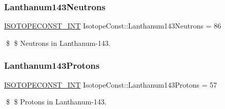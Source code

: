 \subsubsection{\texorpdfstring{Lanthanum143\+Neutrons}{Lanthanum143Neutrons}}
{\footnotesize\ttfamily \mbox{\hyperlink{group___isotope_const-_macros_ga5f18360b3e99483a35c32d789e62621c}{I\+S\+O\+T\+O\+P\+E\+C\+O\+N\+S\+T\+\_\+\+I\+NT}} Isotope\+Const\+::\+Lanthanum143\+Neutrons = 86}

\$ \$ Neutrons in Lanthanum-\/143. \mbox{\label{group___isotope_const-_lanthanum-_la143_ga9ef3306a039b4b6a98c0d0f2dcf8eef3}} 
\subsubsection{\texorpdfstring{Lanthanum143\+Protons}{Lanthanum143Protons}}
{\footnotesize\ttfamily \mbox{\hyperlink{group___isotope_const-_macros_ga5f18360b3e99483a35c32d789e62621c}{I\+S\+O\+T\+O\+P\+E\+C\+O\+N\+S\+T\+\_\+\+I\+NT}} Isotope\+Const\+::\+Lanthanum143\+Protons = 57}

\$ \$ Protons in Lanthanum-\/143. 